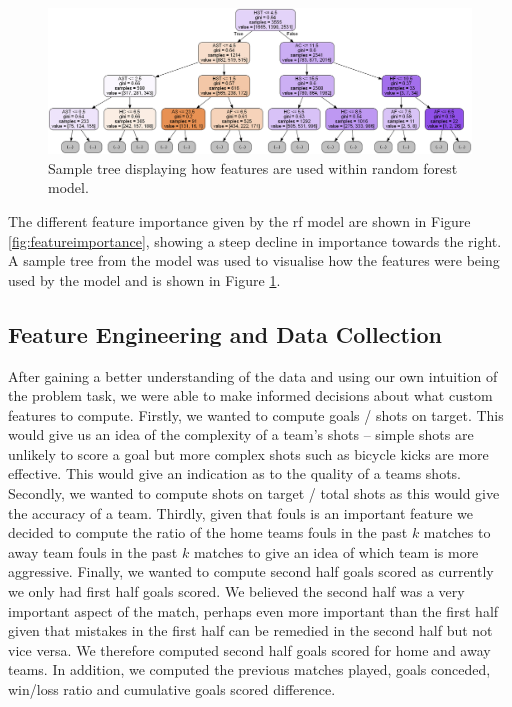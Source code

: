 \documentclass{article}
\begin{document}
\begin{figure}[!htb]
    \centering
    \includegraphics[width=\linewidth]{Images/Figure 3.png}
    \caption{Sample tree displaying how features are used within random forest model.}
    \label{fig:sampletree}
\end{figure}

The different feature importance given by the \gls{rf} model are shown in Figure \ref{fig:featureimportance}, showing a steep decline in importance towards the right. A sample tree from the model was used to visualise how the features were being used by the model and is shown in Figure \ref{fig:sampletree}. 

\subsection{Feature Engineering and Data Collection}
\label{featureengineering}

After gaining a better understanding of the data and using our own intuition of the problem task, we were able to make informed decisions about what custom features to compute. Firstly, we wanted to compute goals / shots on target. This would give us an idea of the complexity of a team’s shots – simple shots are unlikely to score a goal but more complex shots such as bicycle kicks are more effective. This would give an indication as to the quality of a teams shots. Secondly, we wanted to compute shots on target / total shots as this would give the accuracy of a team. Thirdly, given that fouls is an important feature we decided to compute the ratio of the home teams fouls in the past $k$ matches to away team fouls in the past $k$ matches to give an idea of which team is more aggressive. Finally, we wanted to compute second half goals scored as currently we only had first half goals scored. We believed the second half was a very important aspect of the match, perhaps even more important than the first half given that mistakes in the first half can be remedied in the second half but not vice versa. We therefore computed second half goals scored for home and away teams. In addition, we computed the previous matches played, goals conceded, win/loss ratio and cumulative goals scored difference.
\end{document}

